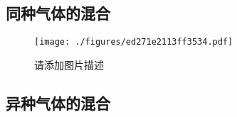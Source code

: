 

\begin{issues}
\issueDraft
\end{issues}

\subsection{同种气体的混合}
\begin{figure}[ht]
\centering
\texttt{[image: ./figures/ed271e2113ff3534.pdf]}
\caption{请添加图片描述} \label{fig_IGME_1}
\end{figure}

\subsection{异种气体的混合}
